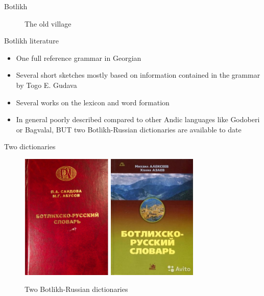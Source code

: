 \begin{frame}{Botlikh}
\begin{figure}[h]
\centering
{}
\caption{The old village}
\end{figure}
\end{frame}

\begin{frame}{Botlikh literature}
\begin{itemize}
    \item One full reference grammar in Georgian \citep{gudava1962}
    \item Several short sketches mostly based on information contained in the grammar by Togo E. Gudava \citep{gudava1967, azaev2000, saidova2001, magomedbekova2001, xalidova2017, alekseevverhees}
    \item Several works on the lexicon and word formation \citep{azaev1975, sulejmanova2013, alekseev2016}
    \item In general poorly described compared to other Andic languages like Godoberi or Bagvalal, BUT two Botlikh-Russian dictionaries are available to date \citep{saidovaabusov2012, alekseev2019}
\end{itemize}
\end{frame}

\begin{frame}{Two dictionaries}
\begin{figure}[h]
\includegraphics[height=6cm]{images/abusov2012.jpg} 
\includegraphics[height=6cm]{images/alekseev2019.jpg}
\label{two_dicts}
\caption{Two Botlikh-Russian dictionaries}
\end{figure}
\end{frame}

